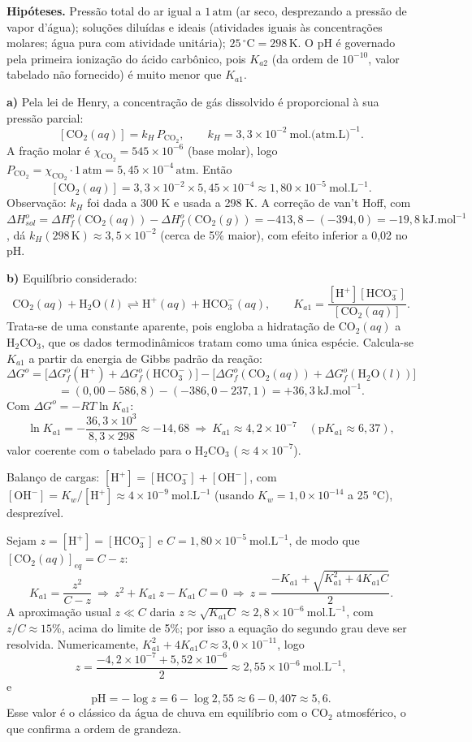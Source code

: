 \documentclass{article}%
\begin{document}
\textbf{Hipóteses.} Pressão total do ar igual a $1\,\text{atm}$ (ar seco, desprezando a pressão de vapor d'água); soluções diluídas e ideais (atividades iguais às concentrações molares; água pura com atividade unitária); $25\,^{\circ}\text{C}=298\,\text{K}$. O pH é governado pela primeira ionização do ácido carbônico, pois $K_{a2}$ (da ordem de $10^{-10}$, valor tabelado não fornecido) é muito menor que $K_{a1}$.

\textbf{a)} Pela lei de Henry, a concentração de gás dissolvido é proporcional à sua pressão parcial:
\[
[\text{CO}_2(aq)]=k_H\,P_{\text{CO}_2},\qquad k_H=3{,}3\times10^{-2}\ \text{mol.(atm.L)}^{-1}.
\]
A fração molar é $\chi_{\text{CO}_2}=545\times10^{-6}$ (base molar), logo $P_{\text{CO}_2}=\chi_{\text{CO}_2}\cdot 1\,\text{atm}=5{,}45\times10^{-4}\,\text{atm}$. Então
\[
[\text{CO}_2(aq)]=3{,}3\times10^{-2}\times5{,}45\times10^{-4}\approx1{,}80\times10^{-5}\ \text{mol.L}^{-1}.
\]
Observação: $k_H$ foi dada a 300 K e usada a 298 K. A correção de van't Hoff, com $\Delta H^o_{sol}=\Delta H^o_f(\text{CO}_2(aq))-\Delta H^o_f(\text{CO}_2(g))=-413{,}8-(-394{,}0)=-19{,}8\ \text{kJ.mol}^{-1}$, dá $k_H(298\,\text{K})\approx3{,}5\times10^{-2}$ (cerca de 5\% maior), com efeito inferior a 0,02 no pH.

\textbf{b)} Equilíbrio considerado:
\[
\text{CO}_2(aq)+\text{H}_2\text{O}(l)\rightleftharpoons\text{H}^+(aq)+\text{HCO}_3^-(aq),\qquad K_{a1}=\frac{[\text{H}^+][\text{HCO}_3^-]}{[\text{CO}_2(aq)]}.
\]
Trata-se de uma constante aparente, pois engloba a hidratação de $\text{CO}_2(aq)$ a $\text{H}_2\text{CO}_3$, que os dados termodinâmicos tratam como uma única espécie. Calcula-se $K_{a1}$ a partir da energia de Gibbs padrão da reação:
\[
\Delta G^o=\big[\Delta G^o_f(\text{H}^+)+\Delta G^o_f(\text{HCO}_3^-)\big]-\big[\Delta G^o_f(\text{CO}_2(aq))+\Delta G^o_f(\text{H}_2\text{O}(l))\big]
\]
\[
=(0{,}00-586{,}8)-(-386{,}0-237{,}1)=+36{,}3\ \text{kJ.mol}^{-1}.
\]
Com $\Delta G^o=-RT\ln K_{a1}$:
\[
\ln K_{a1}=-\frac{36{,}3\times10^{3}}{8{,}3\times298}\approx-14{,}68\ \Rightarrow\ K_{a1}\approx4{,}2\times10^{-7}\quad(\text{p}K_{a1}\approx6{,}37),
\]
valor coerente com o tabelado para o H$_2$CO$_3$ ($\approx4\times10^{-7}$).

Balanço de cargas: $[\text{H}^+]=[\text{HCO}_3^-]+[\text{OH}^-]$, com $[\text{OH}^-]=K_w/[\text{H}^+]\approx4\times10^{-9}\ \text{mol.L}^{-1}$ (usando $K_w=1{,}0\times10^{-14}$ a 25 °C), desprezível.

Sejam $z=[\text{H}^+]=[\text{HCO}_3^-]$ e $C=1{,}80\times10^{-5}\ \text{mol.L}^{-1}$, de modo que $[\text{CO}_2(aq)]_{eq}=C-z$:
\[
K_{a1}=\frac{z^2}{C-z}\ \Rightarrow\ z^2+K_{a1}\,z-K_{a1}\,C=0\ \Rightarrow\ z=\frac{-K_{a1}+\sqrt{K_{a1}^2+4K_{a1}C}}{2}.
\]
A aproximação usual $z\ll C$ daria $z\approx\sqrt{K_{a1}C}\approx2{,}8\times10^{-6}\ \text{mol.L}^{-1}$, com $z/C\approx15\%$, acima do limite de 5\%; por isso a equação do segundo grau deve ser resolvida. Numericamente, $K_{a1}^2+4K_{a1}C\approx3{,}0\times10^{-11}$, logo
\[
z=\frac{-4{,}2\times10^{-7}+5{,}52\times10^{-6}}{2}\approx2{,}55\times10^{-6}\ \text{mol.L}^{-1},
\]
e
\[
\text{pH}=-\log z=6-\log2{,}55\approx6-0{,}407\approx5{,}6.
\]
Esse valor é o clássico da água de chuva em equilíbrio com o $\text{CO}_2$ atmosférico, o que confirma a ordem de grandeza.
\end{document}
